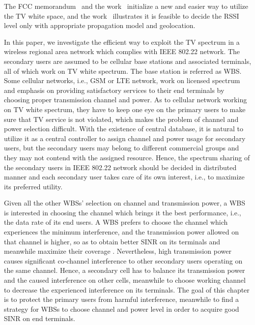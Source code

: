 \documentclass[times]{ettauth}
\newcommand{\ie}{i.e., }
\theoremstyle{mytheoremstyle}
\theoremstyle{mytheoremstyle}
\theoremstyle{mytheoremstyle}
\begin{document}
The FCC memorandum~\cite{FCC_2010_sedond_memorandumm,FCCdatabasae} and the work~\cite{SenseLess2011} initialize a new and easier way to utilize the TV white space, and the work~\cite{SenseLess2011} illustrates it is feasible to decide the RSSI level only with appropriate propagation model and geolocation.

In this paper, we investigate the efficient way to exploit the TV spectrum in a wireless regional area network which complies with IEEE 802.22 network.
The secondary users are assumed to be cellular base stations and associated terminals, all of which work on TV white spectrum. 
The base station is referred as WBS.
Some cellular networks, \ie GSM or LTE network, work on licensed spectrum and emphasis on providing satisfactory services to their end terminals by choosing proper transmission channel and power. 
As to cellular network working on TV white spectrum, they have to keep one eye on the primary users to make sure that TV service is not violated, which makes the problem of channel and power selection difficult.
With the existence of central database, it is natural to utilize it as a central controller to assign channel and power usage for secondary users, but the secondary users may belong to different commercial groups and they may not contend with the assigned resource.
Hence, the spectrum sharing of the secondary users in IEEE 802.22 network should be decided in distributed manner and each secondary user takes care of its own interest, \ie to maximize its preferred utility.

Given all the other WBSs' selection on channel and transmission power, a WBS is interested in choosing the channel which brings it the best performance, \ie the data rate of its end users.
A WBS prefers to choose the channel which experiences the minimum interference, and the transmission power allowed on that channel is higher, so as to obtain better SINR on its terminals and meanwhile maximize their coverage \cite{wuinfocom09, HoangPowerChannel2010}. 
Nevertheless, high transmission power causes significant co-channel interference to other secondary users operating on the same channel. 
Hence, a secondary cell has to balance its transmission power and the caused interference on other cells, meanwhile to choose working channel to decrease the experienced interference on its terminals. 
The goal of this chapter is to protect the primary users from harmful interference, meanwhile to find a strategy for WBSs to choose channel and power level in order to acquire good SINR on end terminals.
\end{document}
